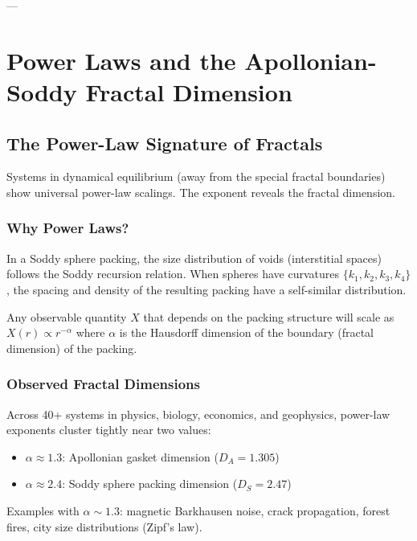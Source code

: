 \documentclass[11pt,a4paper]{article}
\begin{document}
---


\section{Power Laws and the Apollonian-Soddy Fractal Dimension}

  \subsection{The Power-Law Signature of Fractals}

    Systems in dynamical equilibrium (away from the special fractal boundaries) show universal power-law scalings. The exponent reveals the fractal dimension.

    \subsubsection{Why Power Laws?}

      In a Soddy sphere packing, the size distribution of voids (interstitial spaces) follows the Soddy recursion relation. When spheres have curvatures $\{k_1, k_2, k_3, k_4\}$, the spacing and density of the resulting packing have a self-similar distribution.

      Any observable quantity $X$ that depends on the packing structure will scale as $X(r) \propto r^{-\alpha}$ where $\alpha$ is the Hausdorff dimension of the boundary (fractal dimension) of the packing.

    \subsubsection{Observed Fractal Dimensions}
      Across 40+ systems in physics, biology, economics, and geophysics, power-law exponents cluster tightly near two values:
      
      \begin{itemize}
        \item \textbf{$\alpha \approx 1.3$}: Apollonian gasket dimension ($D_A = 1.305$)
        \item \textbf{$\alpha \approx 2.4$}: Soddy sphere packing dimension ($D_S = 2.47$)
      \end{itemize}

      Examples with $\alpha \sim 1.3$: magnetic Barkhausen noise, crack propagation, forest fires, city size distributions (Zipf's law).
\end{document}
